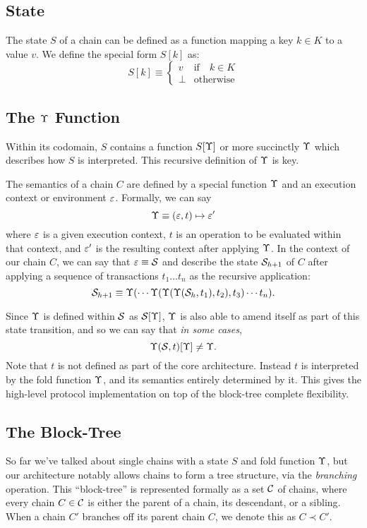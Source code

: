 \subsection{State}

The state $S$ of a chain can be defined as a function mapping a key $k \in K$ to a
value $v$. We define the special form $S[k]$ as:
\[
    S[k] \equiv \begin{cases}
        v                   & \text{if} \quad k \in K \\
        \bot                & \text{otherwise}
    \end{cases}
\]

\subsection{The $\Upsilon$ Function} \label{fold-function}

Within its codomain, $S$ contains a function $S[\Upsilon]$ or more succinctly
$\Upsilon$ which describes how $S$ is interpreted. This recursive definition
of $\Upsilon$ is key.

The semantics of a chain $C$ are defined by a special function $\Upsilon$ and an
execution context or environment $\varepsilon$. Formally, we can say
\[
    \Upsilon \equiv (\varepsilon, t) \mapsto \varepsilon'
\]
where $\varepsilon$ is a given execution context, $t$ is an operation to be evaluated
within that context, and $\varepsilon'$ is the resulting context after applying
$\Upsilon$.  In the context of our chain $C$, we can say that $\varepsilon \equiv \mathcal{S}$
and describe the state $\mathcal{S}_{h+1}$ of $C$ after applying a sequence of
transactions $t_1 \dots t_n$ as the recursive application:
\[
    \mathcal{S}_{h+1} \equiv \Upsilon(\cdots \Upsilon(\Upsilon(\Upsilon(\mathcal{S}_h,
    t_1), t_2), t_3) \cdots t_n).
\]

Since $\Upsilon$ is defined within $\mathcal{S}$ as $\mathcal{S}[\Upsilon]$, $\Upsilon$ is also
able to amend itself as part of this state transition, and so we can say that
\emph{in some cases},
\[
    \Upsilon(\mathcal{S}, t)[\Upsilon] \neq \Upsilon.
\]
Note that $t$ is not defined as part of the core architecture. Instead $t$ is
interpreted by the fold function $\Upsilon$, and its semantics entirely determined
by it. This gives the high-level protocol implementation on top of the block-tree
complete flexibility.

\subsection{The Block-Tree}

So far we've talked about single chains with a state $S$ and fold function
$\Upsilon$, but our architecture notably allows chains to form a tree structure,
via the \emph{branching} operation. This ``block-tree'' is represented formally
as a set $\mathcal{C}$ of chains, where every chain $C \in \mathcal{C}$ is either the
parent of a chain, its descendant, or a sibling. When a chain $C'$ branches off
its parent chain $C$, we denote this as $C \prec C'$.

